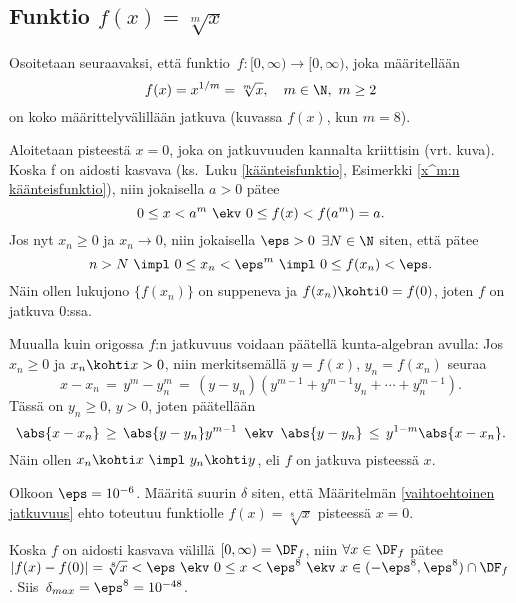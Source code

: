\subsection*{Funktio $f(x) = \sqrt[m]{x}$}

Osoitetaan seuraavaksi, että funktio $f:[0,\infty)\rightarrow [0,\infty)$, joka määritellään
\[
f(x)=x^{1/m}=\sqrt[m]{x},\quad m\in\N, \ m\geq 2
\]
on koko määrittelyvälillään jatkuva (kuvassa $f(x)$, kun $m=8$).
\begin{figure}[H]
\begin{center}
\end{center}
\end{figure}
Aloitetaan pisteestä $x=0$, joka on jatkuvuuden kannalta kriittisin (vrt. kuva). Koska f on 
aidosti kasvava (ks.\ Luku \ref{käänteisfunktio}, Esimerkki \ref{x^m:n käänteisfunktio}),
niin jokaisella $a>0$ pätee
\[
0 \le x < a^m\ \ekv\ 0 \le f(x) < f(a^m) = a.
\]
Jos nyt $x_n\geq 0$ ja $x_n\rightarrow 0$, niin jokaisella $\eps>0$ $\exists N\in\N$ siten,
että pätee
\[
n>N \ \impl \ 0 \le x_n < \eps^m \ \impl\ 0 \le f(x_n) < \eps.
\]
Näin ollen lukujono $\{f(x_n)\}$ on suppeneva ja $f(x_n) \kohti 0=f(0)$, joten $f$ on jatkuva 
$0$:ssa.

Muualla kuin origossa $f$:n jatkuvuus voidaan päätellä kunta-algebran avulla: Jos 
$x_n \ge 0$ ja $x_n \kohti x>0$, niin merkitsemällä $y=f(x)$, $y_n=f(x_n)$ seuraa
\[
x-x_n \,=\, y^m-y_n^m \,=\, (y-y_n)(y^{m-1}+y^{m-1}y_n+\cdots +y_n^{m-1}).
\]
Tässä on $y_n \ge 0$, $y>0$, joten päätellään
\[
\abs{x-x_n}\,\ge\,\abs{y-y_n}y^{m-1} \,\ \ekv\,\ \abs{y-y_n}\,\le\,y^{1-m}\abs{x-x_n}.
\]
Näin ollen $x_n \kohti x \ \impl\ y_n \kohti y$, eli $f$ on jatkuva pisteessä $x$.
\begin{Exa} \label{epsilon ja delta} Olkoon $\eps = 10^{-6}$. Määritä suurin $\delta$ siten,
että Määritelmän \ref{vaihtoehtoinen jatkuvuus} ehto toteutuu funktiolle $f(x)=\sqrt[8]{x}$
pisteessä $x=0$.
\end{Exa}
\ratk Koska $f$ on aidosti kasvava välillä $[0,\infty)=\DF_f$, niin $\forall x\in\DF_f$ pätee
$|f(x)-f(0)|=\sqrt[8]{x} < \eps\ \ekv\ 0 \le x < \eps^8\ \ekv\ x\in(-\eps^8,\eps^8)\cap\DF_f$.
Siis $\,\delta_{max} = \eps^8 = 10^{-48}$. \loppu

